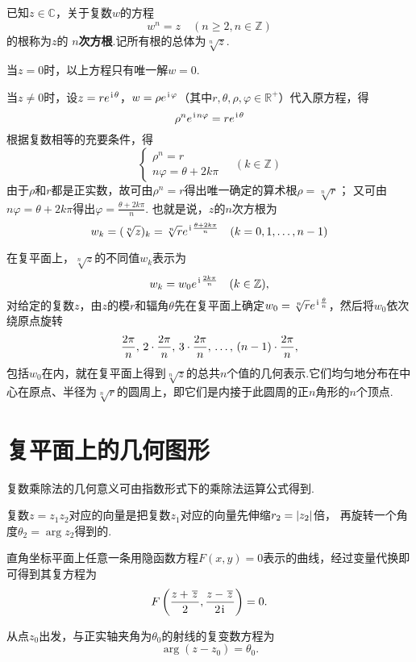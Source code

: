 \begin{definition}[复数的方根]
已知\(z\in\mathbb{C}\)，关于复数\(w\)的方程\[
w^n = z \quad (n \geqslant 2, n \in \mathbb{Z})
\]的根称为\(z\)的\textbf{ \(n\)次方根}.记所有根的总体为\(\sqrt[n]{z}\).

当\(z=0\)时，以上方程只有唯一解\(w = 0\).

当\(z \neq 0\)时，设\(z=re^{\kern1pt\mathrm{i}\kern1pt\theta}\)，\(w=\rho e^{\kern1pt\mathrm{i}\kern1pt\varphi}\)（其中\(r,\theta,\rho,\varphi\in\mathbb{R}^+\)）代入原方程，得\[
\rho^n e^{\kern1pt\mathrm{i}\kern1pt n \varphi} = r e^{\kern1pt\mathrm{i}\kern1pt\theta}
\]根据复数相等的充要条件，得\[
\left\{ \begin{array}{l}
\rho^n = r \\
n\varphi = \theta + 2k\pi
\end{array} \right. \quad (k \in \mathbb{Z})
\]由于\(\rho\)和\(r\)都是正实数，故可由\(\rho^n=r\)得出唯一确定的算术根\(\rho=\sqrt[n]{r}\)；
又可由\(n\varphi=\theta+2k\pi\)得出\(\varphi=\frac{\theta+2k\pi}{n}\).
也就是说，\(z\)的\(n\)次方根为\[
w_k = (\sqrt[n]{z})_k = \sqrt[n]{r} e^{\kern1pt\mathrm{i}\kern1pt \frac{\theta + 2k\pi}{n}} \quad (k=0,1,\dotsc,n-1)
\]
\end{definition}

在复平面上，\(\sqrt[n]{z}\)的不同值\(w_k\)表示为\[
w_k = w_0 e^{\kern1pt\mathrm{i}\kern1pt\frac{2k\pi}{n}} \quad (k \in \mathbb{Z}),
\]对给定的复数\(z\)，由\(z\)的模\(r\)和辐角\(\theta\)先在复平面上确定\(w_0 = \sqrt[n]{r} e^{\kern1pt\mathrm{i}\kern1pt\frac{\theta}{n}}\)，然后将\(w_0\)依次绕原点旋转\[
\def\f{\frac{2\pi}{n}}
\f,\,2\cdot\f,\,3\cdot\f,\,\dots,\,(n-1)\cdot\f,
\]包括\(w_0\)在内，就在复平面上得到\(\sqrt[n]{z}\)的总共\(n\)个值的几何表示.它们均匀地分布在中心在原点、半径为\(\sqrt[n]{r}\)的圆周上，即它们是内接于此圆周的正\(n\)角形的\(n\)个顶点.

\section{复平面上的几何图形}
复数乘除法的几何意义可由指数形式下的乘除法运算公式得到.

复数\(z=z_1 z_2\)对应的向量是把复数\(z_1\)对应的向量先伸缩\(r_2 = \abs{z_2}\)倍，%
再旋转一个角度\(\theta_2 = \arg z_2\)得到的.

直角坐标平面上任意一条用隐函数方程\(F(x,y)=0\)表示的曲线，经过变量代换即可得到其复方程为\[
F\left(\frac{z+\kern1pt\overline{z}\kern1pt}{2},\frac{z-\kern1pt\overline{z}\kern1pt}{2\kern1pt\mathrm{i}\kern1pt}\right)=0.
\]

\begin{example}[射线]
从点\(z_0\)出发，与正实轴夹角为\(\theta_0\)的射线的复变数方程为\[
\arg(z-z_0) = \theta_0.
\]
\end{example}

